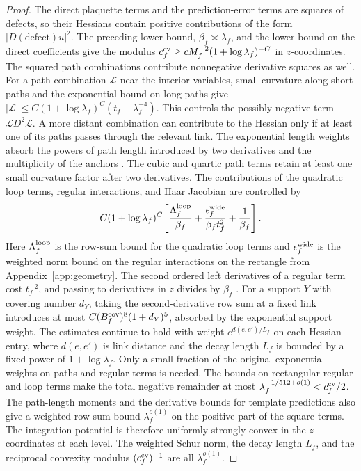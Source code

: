 \documentclass[11pt,a4paper]{article}
\numberwithin{equation}{section}
\begin{document}
\begin{proof}
The direct plaquette terms and the prediction-error terms are squares of defects, so their Hessians contain positive contributions of the form \(|D(\text{defect})u|^2\). The preceding lower bound, \(\beta_f\asymp\lambda_f\), and the lower bound on the direct coefficients give the modulus \(c_f^{\rm cv}\ge cM_f^{-2}(1+\log\lambda_f)^{-C}\) in \(z\)-coordinates. The squared path combinations contribute nonnegative derivative squares as well. For a path combination \(\mathcal L\) near the interior variables, small curvature along short paths and the exponential bound on long paths give \(|\mathcal L|\le C(1+\log\lambda_f)^C(t_f+\lambda_f^{-4})\). This controls the possibly negative term \(\mathcal L D^2\mathcal L\). A more distant combination can contribute to the Hessian only if at least one of its paths passes through the relevant link. The exponential length weights absorb the powers of path length introduced by two derivatives and the multiplicity of the anchors \cite[Lemma 12.3]{armstrong}. The cubic and quartic path terms retain at least one small curvature factor after two derivatives. The contributions of the quadratic loop terms, regular interactions, and Haar Jacobian are controlled by
\[
 C(1+\log\lambda_f)^C\!
 \left[
 \frac{\Lambda_f^{\rm loop}}{\beta_f}
 +\frac{\epsilon_f^{\rm wide}}{\beta_f t_f^2}
 +\frac1{\beta_f}\right].
\]
Here \(\Lambda_f^{\rm loop}\) is the row-sum bound for the quadratic loop terms and \(\epsilon_f^{\rm wide}\) is the weighted norm bound on the regular interactions on the rectangle from Appendix~\ref{app:geometry}. The second ordered left derivatives of a regular term cost \(t_f^{-2}\), and passing to derivatives in \(z\) divides by \(\beta_f\) \cite[Definitions 5.3--5.4]{armstrong}. For a support \(Y\) with covering number \(d_Y\), taking the second-derivative row sum at a fixed link introduces at most \(C(B_f^{\rm cov})^8(1+d_Y)^5\), absorbed by the exponential support weight. The estimates continue to hold with weight \(e^{d(e,e')/L_f}\) on each Hessian entry, where \(d(e,e')\) is link distance and the decay length \(L_f\) is bounded by a fixed power of \(1+\log\lambda_f\). Only a small fraction of the original exponential weights on paths and regular terms is needed. The bounds on rectangular regular and loop terms make the total negative remainder at most \(\lambda_f^{-1/512+o(1)}<c_f^{\rm cv}/2\). The path-length moments and the derivative bounds for template predictions also give a weighted row-sum bound \(\lambda_f^{o(1)}\) on the positive part of the square terms. The integration potential is therefore uniformly strongly convex in the \(z\)-coordinates at each level. The weighted Schur norm, the decay length \(L_f\), and the reciprocal convexity modulus \((c_f^{\rm cv})^{-1}\) are all \(\lambda_f^{o(1)}\).


\end{proof}
\end{document}
